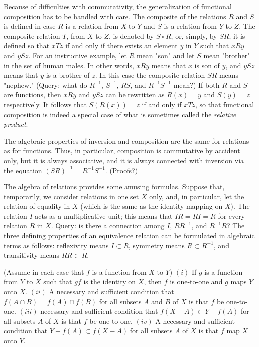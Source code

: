Because of difficulties with commutativity, the generalization of functional composition has to be handled with care. The composite of the relations $R$ and $S$ is defined in case $R$ is a relation from $X$ to $Y$ and $S$ is a relation from $Y$ to $Z$. The composite relation $T$, from $X$ to $Z$, is denoted by $S \circ R$, or, simply, by $SR$; it is defined so that $xTz$ if and only if there exists an element $y$ in $Y$ such that $xRy$ and $ySz$. For an instructive example, let $R$ mean "son" and let $S$ mean "brother" in the set of human males. In other words, $xRy$ means that $x$ is son of $y$, and $ySz$ means that $y$ is a brother of $z$. In this case the composite relation $SR$ means "nephew." (Query: what do $R^{-1}$, $S^{-1}$, $RS$, and $R^{-1}S^{-1}$ mean?) If both $R$ and $S$ are functions, then $xRy$ and $ySz$ can be rewritten as $R(x) = y$ and $S(y) = z$ respectively. It follows that $S(R(x)) = z$ if and only if $xTz$, so that functional composition is indeed a special case of what is sometimes called the \textit{relative product}.

The algebraic properties of inversion and composition are the same for relations as for functions. Thus, in particular, composition is commutative by accident only, but it is always associative, and it is always connected with inversion via the equation $(SR)^{-1} = R^{-1}S^{-1}$. (Proofs?) 

The algebra of relations provides some amusing formulas.   Suppose that, temporarily, we consider relations in one set $X$ only, and, in particular, let the relation of equality in $X$ (which is the same as the identity mapping on $X$). The relation $I$ acts as a multiplicative unit; this means that $IR = RI = R$ for every relation $R$ in $X$. Query: is there a connection among $I$, $RR^{-1}$, and $R^{-1}R$? The three defining properties of an equivalence relation can be formulated in algebraic terms as follows: reflexivity means $I \subset R$, symmetry means $R \subset R^{-1}$, and transitivity means $RR \subset R$. 

\begin{exercise} (Assume in each case that $f$ is a function from $X$ to $Y$) $(i)$ If $g$ is a function from $Y$ to $X$ such that $gf$ is the identity on $X$, then $f$ is one-to-one and $g$ maps $Y$ onto $X$. $(ii)$ A necessary and sufficient condition that $f(A \cap B) = f(A) \cap f(B)$ for all subsets $A$ and $B$ of $X$ is that $f$ be one-to-one. $(iii)$ necessary and sufficient condition that $f(X - A) \subset Y - f(A)$ for all subsets $A$ of $X$ is that $f$ be one-to-one. $(iv)$ A necessary and sufficient condition that $Y - f(A) \subset f(X - A)$ for all subsets $A$ of $X$ is that $f$ map $X$ onto $Y$.
\end{exercise}
